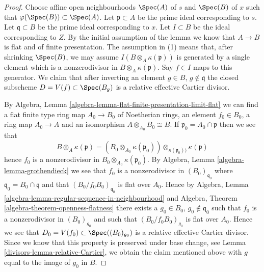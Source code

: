 \begin{proof}

Choose affine open neighbourhoods $\Spec(A)$ of $s$ and
$\Spec(B)$ of $x$ such that
$\varphi(\Spec(B)) \subset \Spec(A)$.
Let $\mathfrak p \subset A$ be the prime ideal corresponding to $s$.
Let $\mathfrak q \subset B$ be the prime ideal corresponding to $x$.
Let $I \subset B$ be the ideal corresponding to $Z$.
By the initial assumption of the lemma we know that
$A \to B$ is flat and of finite presentation.
The assumption in (1) means that, after shrinking $\Spec(B)$, we may
assume $I(B \otimes_A \kappa(\mathfrak p))$ is generated by a single
element which is a nonzerodivisor in $B \otimes_A \kappa(\mathfrak p)$.
Say $f \in I$ maps to this generator. We claim that after inverting
an element $g \in B$, $g \not \in \mathfrak q$ the closed subscheme
$D = V(f) \subset \Spec(B_g)$ is a relative effective Cartier
divisor.

\medskip\noindent
By
Algebra, Lemma \ref{algebra-lemma-flat-finite-presentation-limit-flat}
we can find a flat finite type ring map $A_0 \to B_0$ of Noetherian
rings, an element $f_0 \in B_0$, a ring map $A_0 \to A$ and an isomorphism
$A \otimes_{A_0} B_0 \cong B$. If $\mathfrak p_0 = A_0 \cap \mathfrak p$
then we see that
$$
B \otimes_A \kappa(\mathfrak p) =
\left(B_0 \otimes_{A_0} \kappa(\mathfrak p_0)\right)
\otimes_{\kappa(\mathfrak p_0))} \kappa(\mathfrak p)
$$
hence $f_0$ is a nonzerodivisor in $B_0 \otimes_{A_0} \kappa(\mathfrak p_0)$.
By
Algebra, Lemma \ref{algebra-lemma-grothendieck}
we see that $f_0$ is a nonzerodivisor in $(B_0)_{\mathfrak q_0}$
where $\mathfrak q_0 = B_0 \cap \mathfrak q$ and
that $(B_0/f_0B_0)_{\mathfrak q_0}$ is flat over $A_0$. Hence by
Algebra, Lemma \ref{algebra-lemma-regular-sequence-in-neighbourhood}
and
Algebra, Theorem \ref{algebra-theorem-openness-flatness}
there exists a $g_0 \in B_0$, $g_0 \not \in \mathfrak q_0$ such
that $f_0$ is a nonzerodivisor in $(B_0)_{g_0}$ and such that
$(B_0/f_0B_0)_{g_0}$ is flat over $A_0$. Hence we see that
$D_0 = V(f_0) \subset \Spec((B_0)_{g_0})$ is a relative effective
Cartier divisor. Since we know that this property is preserved under
base change, see
Lemma \ref{divisors-lemma-relative-Cartier},
we obtain the claim mentioned above with $g$ equal to the image of $g_0$
in $B$.


\end{proof}
